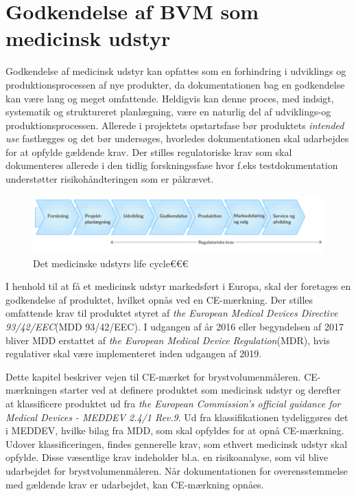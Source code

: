 	
\section{Godkendelse af BVM som medicinsk udstyr}

Godkendelse af medicinsk udstyr kan opfattes som en forhindring i udviklings og produktionsprocessen af nye produkter, da dokumentationen bag en godkendelse kan være lang og meget omfattende. Heldigvis kan denne proces, med indsigt, systematik og struktureret planlægning, være en naturlig del af udviklings-og produktionsprocessen. Allerede i projektets opstartsfase bør produktets \textit{intended use} fastlægges og det bør undersøges, hvorledes dokumentationen skal udarbejdes for at opfylde gældende krav.
Der stilles regulatoriske krav som skal dokumenteres allerede i den tidlig forskningssfase hvor f.eks testdokumentation understøtter risikohåndteringen som er påkrævet. 

\begin{figure}[htb]
\centering	
\includegraphics[width=5in]{life}
\caption{Det medicinske udstyrs life cycle€€€}
\label{fig:label}
\end{figure}
   

I henhold til at få et medicinsk udstyr markedsført i Europa, skal der foretages en godkendelse af produktet, hvilket opnås ved en CE-mærkning. Der stilles omfattende krav til produktet styret af \textit{the European Medical Devices Directive 93/42/EEC}{}(MDD 93/42/EEC). I udgangen af år 2016 eller begyndelsen af 2017 bliver MDD erstattet af \textit{the European Medical Device Regulation}{}(MDR), hvis regulativer skal være implementeret inden udgangen af 2019. 
  
Dette kapitel beskriver vejen til CE-mærket for brystvolumenmåleren. CE-mærkningen starter ved at definere produktet som medicinsk udstyr og derefter at klassificere produktet ud fra \textit{the European Commission's official guidance for Medical Devices - MEDDEV 2.4/1 Rev.9}. Ud fra klassifikationen tydeliggøres det i MEDDEV, hvilke bilag fra MDD, som skal opfyldes for at opnå CE-mærkning. 
Udover klassificeringen, findes gennerelle krav, som ethvert medicinsk udstyr skal opfylde. Disse væsentlige krav indeholder bl.a. en risikoanalyse, som vil blive udarbejdet for brystvolumenmåleren. 
Når dokumentationen for overensstemmelse med gældende krav er udarbejdet, kan CE-mærkning opnåes.


